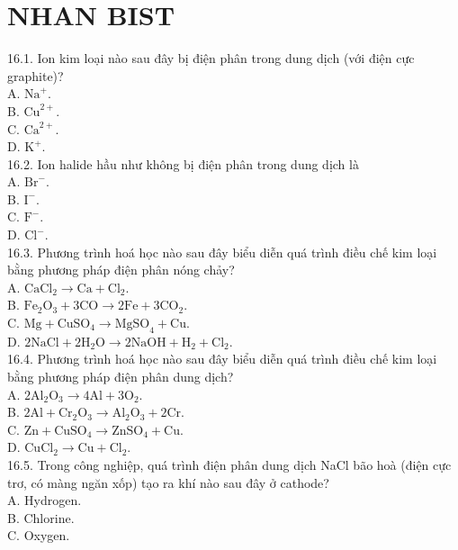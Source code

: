 \documentclass[10pt]{article}
\begin{document}
\section*{NHAN BIST}
16.1. Ion kim loại nào sau đây bị điện phân trong dung dịch (với điện cực graphite)?\\
A. $\mathrm{Na}^{+}$.\\
B. $\mathrm{Cu}^{2+}$.\\
C. $\mathrm{Ca}^{2+}$.\\
D. $\mathrm{K}^{+}$.\\
16.2. Ion halide hầu như không bị điện phân trong dung dịch là\\
A. $\mathrm{Br}^{-}$.\\
B. $\mathrm{I}^{-}$.\\
C. $\mathrm{F}^{-}$.\\
D. $\mathrm{Cl}^{-}$.\\
16.3. Phương trình hoá học nào sau đây biểu diễn quá trình điều chế kim loại bằng phương pháp điện phân nóng chảy?\\
A. $\mathrm{CaCl}_{2} \longrightarrow \mathrm{Ca}+\mathrm{Cl}_{2}$.\\
B. $\mathrm{Fe}_{2} \mathrm{O}_{3}+3 \mathrm{CO} \longrightarrow 2 \mathrm{Fe}+3 \mathrm{CO}_{2}$.\\
C. $\mathrm{Mg}+\mathrm{CuSO}_{4} \longrightarrow \mathrm{MgSO}_{4}+\mathrm{Cu}$.\\
D. $2 \mathrm{NaCl}+2 \mathrm{H}_{2} \mathrm{O} \longrightarrow 2 \mathrm{NaOH}+\mathrm{H}_{2}+\mathrm{Cl}_{2}$.\\
16.4. Phương trình hoá học nào sau đây biểu diễn quá trình điều chế kim loại bằng phương pháp điện phân dung dịch?\\
A. $2 \mathrm{Al}_{2} \mathrm{O}_{3} \longrightarrow 4 \mathrm{Al}+3 \mathrm{O}_{2}$.\\
B. $2 \mathrm{Al}+\mathrm{Cr}_{2} \mathrm{O}_{3} \longrightarrow \mathrm{Al}_{2} \mathrm{O}_{3}+2 \mathrm{Cr}$.\\
C. $\mathrm{Zn}+\mathrm{CuSO}_{4} \longrightarrow \mathrm{ZnSO}_{4}+\mathrm{Cu}$.\\
D. $\mathrm{CuCl}_{2} \longrightarrow \mathrm{Cu}+\mathrm{Cl}_{2}$.\\
16.5. Trong công nghiệp, quá trình điện phân dung dịch NaCl bão hoà (điện cực trơ, có màng ngăn xốp) tạo ra khí nào sau đây ở cathode?\\
A. Hydrogen.\\
B. Chlorine.\\
C. Oxygen.\\
\end{document}
